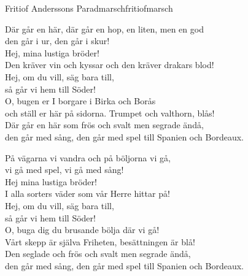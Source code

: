 \begin{song}{Fritiof Anderssons Paradmarsch}{fritiofmarsch}
\begin{vers}
Där går en här, där går en hop, en liten, men en god\\
den går i ur, den går i skur!\\
Hej, mina lustiga bröder!\\
Den kräver vin och kyssar och den kräver drakars blod!\\
Hej, om du vill, säg bara till,\\
så går vi hem till Söder!\\
O, bugen er I borgare i Birka och Borås\\
och ställ er här på sidorna. Trumpet och valthorn, blås!\\
Där går en här som frös och svalt men segrade ändå,\\
den går med sång, den går med spel till Spanien och Bordeaux.\\
\end{vers}
\begin{vers}
På vägarna vi vandra och på böljorna vi gå,\\
vi gå med spel, vi gå med sång!\\
Hej mina lustiga bröder!\\
I alla sorters väder som vår Herre hittar på!\\
Hej, om du vill, säg bara till,\\
så går vi hem till Söder!\\
O, buga dig du brusande bölja där vi gå!\\
Vårt skepp är själva Friheten, besättningen är blå!\\
Den seglade och frös och svalt men segrade ändå,\\
den går med sång, den går med spel till Spanien och Bordeaux.\\
\end{vers}
\end{song}
